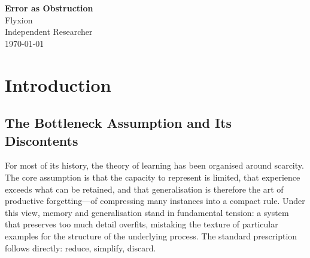 \documentclass[12pt,oneside]{article}
\theoremstyle{plain}
\theoremstyle{definition}
\theoremstyle{remark}
\begin{document}
\begin{center}
  {\LARGE\bfseries Error as Obstruction}\\[1.2em]
  {\large Flyxion}\\[0.4em]
  {\normalsize Independent Researcher}\\[1.8em]
  {\small\today}
\end{center}
\bigskip

\begin{abstract}
\noindent
We develop a unified geometric account of error, learning, and event-sourced
computation in which failure of coherence is identified not with deviation from a
ground-truth value but with a topological impossibility of extension. The central
claim is that an event log, a training dataset, or any preserved history
generates a constraint sheaf over a domain; admissible states are precisely
global sections of that sheaf; and what is ordinarily called an error is a
cohomological obstruction to the existence of such a section. We formalise this
claim through the \emph{Error as Obstruction} theorem, which equates the
convergence of stochastic projected relaxation dynamics with the triviality of a
derived cohomology class. The framework synthesises the RSVP field-space
construction, the Spherepop event-calculus,
and the TARTAN sheaf-consistency architecture into a single
programme: intelligence is the organisation of an overcomplete constraint manifold
under boundary preservation, and error is the failure of that manifold to admit
a globally coherent section.
\end{abstract}

\newpage
\tableofcontents
\newpage

\section{Introduction}

\subsection{The Bottleneck Assumption and Its Discontents}

For most of its history, the theory of learning has been organised around
scarcity. The core assumption is that the capacity to represent is limited, that
experience exceeds what can be retained, and that generalisation is therefore the
art of productive forgetting---of compressing many instances into a compact rule.
Under this view, memory and generalisation stand in fundamental tension: a system
that preserves too much detail overfits, mistaking the texture of particular
examples for the structure of the underlying process. The standard prescription
follows directly: reduce, simplify, discard.
\end{document}
